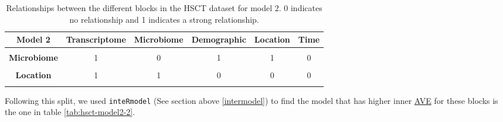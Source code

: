 \documentclass[
  12pt,
  a4paper,
  twoside,
  openright]{book}
\begin{document}
\begin{table}[H]

\caption[Model 2 of the HSCT dataset.]{\label{tab:hsct-model2}Relationships between the different blocks in the HSCT dataset for model 2. 0 indicates no relationship and 1 indicates a strong relationship.}
\centering
\begin{tabular}[t]{>{}c|c|c|c|c|c}
\hline
\textbf{Model 2} & \textbf{Transcriptome} & \textbf{Microbiome} & \textbf{Demographic} & \textbf{Location} & \textbf{Time}\\
\hline
\textbf{\cellcolor{gray!6}{Transcriptome}} & \cellcolor{gray!6}{0} & \cellcolor{gray!6}{1} & \cellcolor{gray!6}{1} & \cellcolor{gray!6}{1} & \cellcolor{gray!6}{0}\\
\hline
\textbf{Microbiome} & 1 & 0 & 1 & 1 & 0\\
\hline
\textbf{\cellcolor{gray!6}{Demographic}} & \cellcolor{gray!6}{1} & \cellcolor{gray!6}{1} & \cellcolor{gray!6}{0} & \cellcolor{gray!6}{0} & \cellcolor{gray!6}{1}\\
\hline
\textbf{Location} & 1 & 1 & 0 & 0 & 0\\
\hline
\textbf{\cellcolor{gray!6}{Time}} & \cellcolor{gray!6}{0} & \cellcolor{gray!6}{0} & \cellcolor{gray!6}{1} & \cellcolor{gray!6}{0} & \cellcolor{gray!6}{0}\\
\hline
\end{tabular}
\end{table}

Following this split, we used \texttt{inteRmodel} (See section above \ref{intermodel}) to find the model that has higher inner \protect\hyperlink{acronyms_AVE}{AVE} for these blocks is the one in table \ref{tab:hsct-model2-2}.

\begin{table}[H]

\caption[Model 2.2 of the HSCT dataset.]{\label{tab:hsct-model2-2}Relationships between the different blocks in the HSCT dataset for model 2.2. 0 indicates no relationship and 1 indicates a strong relationship.}
\centering
{}
\end{table}
\end{document}
